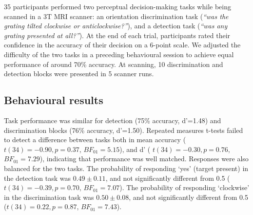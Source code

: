 \documentclass[12pt,twoside]{reedthesis}
\begin{document}
35 participants performed two perceptual decision-making tasks while being scanned in a 3T MRI scanner: an orientation discrimination task (\emph{``was the grating tilted clockwise or anticlockwise?''}), and a detection task (\emph{``was any grating presented at all?''}). At the end of each trial, participants rated their confidence in the accuracy of their decision on a 6-point scale. We adjusted the difficulty of the two tasks in a preceding behavioural session to achieve equal performance of around 70\% accuracy. At scanning, 10 discrimination and detection blocks were presented in 5 scanner runs.

\hypertarget{behavioural-results}{%
\subsection{Behavioural results}\label{behavioural-results}}

Task performance was similar for detection (75\% accuracy, d'=1.48) and discrimination blocks (76\% accuracy, d'=1.50). Repeated measures t-tests failed to detect a difference between tasks both in mean accuracy (\(t(34) = -0.90, p = 0.37\), \(BF_{01}= 5.15\)), and d' ( \(t(34) = -0.30, p = 0.76\), \(BF_{01}=7.29\)), indicating that performance was well matched. Responses were also balanced for the two tasks. The probability of responding `yes' (target present) in the detection task was \(0.49 \pm 0.11\), and not significantly different from 0.5 (\(t(34) = -0.39, p = 0.70\), \(BF_{01}=7.07\)). The probability of responding `clockwise' in the discrimination task was \(0.50 \pm 0.08\), and not significantly different from 0.5 (\(t(34) = 0.22, p=0.87\), \(BF_{01}=7.43\)).
\end{document}
